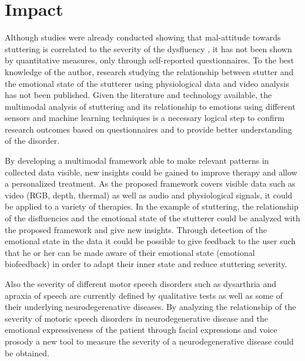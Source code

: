 


\section{Impact}

Although studies were already conducted showing that mal-attitude towards stuttering is correlated to the severity of the dysfluency \cite{Vanryckeghem2001}, it has not been shown by quantitative measures, only through self-reported questionnaires. To the best knowledge of the author, research studying the relationship between stutter and the emotional state of the stutterer using physiological data and video analysis has not been published. Given the literature and technology available, the multimodal analysis of stuttering and its relationship to emotions using different sensors and machine learning techniques is a necessary logical step to confirm research outcomes based on questionnaires and to provide better understanding of the disorder. 

By developing a multimodal framework able to make relevant patterns in collected data visible, new insights could be gained to improve therapy and allow a personalized treatment. As the proposed framework covers visible data such as video (RGB, depth, thermal) as well as audio and physiological signals, it could be applied to a variety of therapies. In the example of stuttering, the relationship of the disfluencies and the emotional state of the stutterer could be analyzed with the proposed framework and give new insights. Through detection of the emotional state in the data it could be possible to give feedback to the user such that he or her can be made aware of their emotional state (emotional biofeedback) in order to adapt their inner state and reduce stuttering severity. \par


Also the severity of different motor speech disorders such as dysarthria and apraxia of speech are currently defined by qualitative tests as well as some of their underlying neurodegerenative diseases. By analyzing the relationship of the severity of motoric speech disorders in neurodegenerative disease and the emotional expressiveness of the patient through facial expressions and voice prosody a new tool to measure the severity of a neurodegenerative disease could be obtained.



